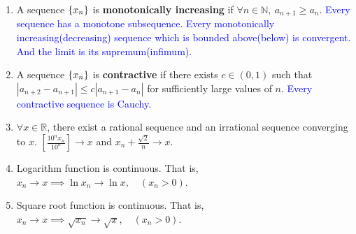 \begin{enumerate}
	\item A sequence $\{x_n\}$ is \textbf{monotonically increasing} if $\forall n \in \mathbb{N},\ a_{n+1} \ge a_n$.
		\subitem \textcolor{blue}{Every sequence has a monotone subsequence.}
		\subitem \textcolor{blue}{Every monotonically increasing(decreasing) sequence which is bounded above(below) is convergent. And the limit is its supremum(infimum).}
	\item A sequence $\{x_n\}$ is \textbf{contractive} if there exists $c \in (0,1)$ such that $|a_{n+2}-a_{n+1}| \le c|a_{n+1}-a_n|$ for sufficiently large values of $n$.
		\subitem \textcolor{blue}{Every contractive sequence is Cauchy.}
	\item $\forall x \in \mathbb{R}$, there exist a rational sequence and an irrational sequence converging to $x$.
		$\left[ \frac{10^n x_n}{10^n} \right] \to x$ and $ x_n + \frac{\sqrt{2}}{n} \to x$.
	\item Logarithm function is continuous.
		That is, $x_n \to x \implies \ln{x_n} \to \ln{x}, \quad (x_n > 0)$.
	\item Square root function is continuous.
		That is, $x_n \to x \implies \sqrt{x_n} \to \sqrt{x}, \quad (x_n > 0)$.
\end{enumerate}
